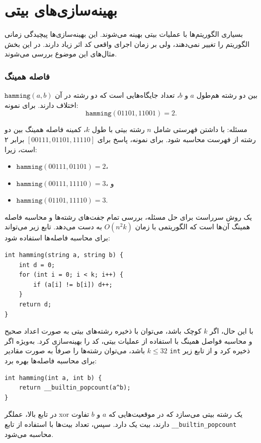 \section{بهینه‌سازی‌های بیتی}

بسیاری الگوریتم‌ها با عملیات بیتی بهینه می‌شوند.
این بهینه‌سازی‌ها پیچیدگی زمانی الگوریتم را تغییر نمی‌دهند، ولی بر زمان اجرای واقعی کد اثر زیاد دارند.
در این بخش مثال‌های این موضوع بررسی می‌شوند.

\subsubsection{فاصله همینگ}

 $\texttt{hamming}(a,b)$ بین دو رشته هم‌طول $a$ و $b$، تعداد جایگاه‌هایی است که دو رشته در آن اختلاف دارند.
برای نمونه:
\[\texttt{hamming}(01101,11001)=2.\]

مسئله: با داشتن فهرستی شامل $n$ رشته بیتی با طول $k$، کمینه فاصله همینگ بین دو رشته از فهرست محاسبه شود.
برای نمونه، پاسخ برای $[00111,01101,11110]$ برابر ۲ است، زیرا:
\begin{itemize}[noitemsep]
\item $\texttt{hamming}(00111,01101)=2$،
\item $\texttt{hamming}(00111,11110)=3$، و
\item $\texttt{hamming}(01101,11110)=3$.
\end{itemize}

یک روش سرراست برای حل مسئله،
بررسی تمام جفت‌های رشته‌ها و محاسبه
فاصله همینگ آن‌ها است
که الگوریتمی با زمان $O(n^2 k)$ به دست می‌دهد.
تابع زیر می‌تواند برای
محاسبه فاصله‌ها استفاده شود:
\begin{lstlisting}
int hamming(string a, string b) {
    int d = 0;
    for (int i = 0; i < k; i++) {
        if (a[i] != b[i]) d++;
    }
    return d;
}
\end{lstlisting}

با این حال، اگر $k$ کوچک باشد، می‌توان با ذخیره
رشته‌های بیتی به صورت اعداد صحیح و
محاسبه فواصل همینگ با استفاده از عملیات بیتی، کد را بهینه‌سازی کرد.
به‌ویژه اگر $k \le 32$ باشد، می‌توان رشته‌ها را صرفاً
به صورت مقادیر \texttt{int} ذخیره کرد و از
تابع زیر برای محاسبه فاصله‌ها بهره برد:
\begin{lstlisting}
int hamming(int a, int b) {
    return __builtin_popcount(a^b);
}
\end{lstlisting}
در تابع بالا، عملگر xor یک رشته بیتی می‌سازد
که در موقعیت‌هایی که $a$ و $b$ تفاوت دارند، بیت یک دارد.
سپس، تعداد بیت‌ها با استفاده از
تابع \texttt{\_\_builtin\_popcount} محاسبه می‌شود.


